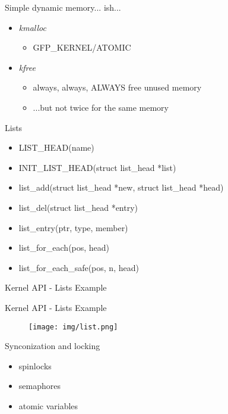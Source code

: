 \documentclass{workshop}
\begin{document}
\begin{frame}{Simple dynamic memory... ish...}
  \begin{itemize}
    \item \emph{kmalloc}
    \begin{itemize}
     \item GFP\_KERNEL/ATOMIC
     \end{itemize}
    \item \emph{kfree}
    \begin{itemize}
     \item always, always, ALWAYS free unused memory
     \item ...but not twice for the same memory
     \end{itemize}
  \end{itemize}
\end{frame}



\begin{frame}{Lists}
  \begin{itemize}

    \item LIST_HEAD(name)
    \item INIT_LIST_HEAD(struct list_head *list)
    \item list_add(struct list_head *new, struct list_head *head)
    \item list_del(struct list_head *entry)
    \item list_entry(ptr, type, member)
    \item list_for_each(pos, head)
    \item list_for_each_safe(pos, n, head)
  \end{itemize}
\end{frame}

\begin{frame}{Kernel API - Lists Example}

\end{frame}

\begin{frame}{Kernel API - Lists Example}
  \begin{figure}
    \texttt{[image: img/list.png]}
  \end{figure}
\end{frame}


\begin{frame}{Synconization and locking}
  \begin{itemize}
    \item spinlocks
    \item semaphores
    \item atomic variables
  \end{itemize}
\end{frame}
\end{document}

